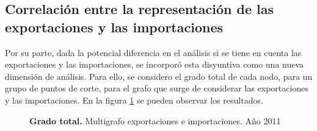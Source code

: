 \documentclass[runningheads,a4paper]{llncs}
\begin{document}
\subsection{Correlación entre la representación de las exportaciones y las importaciones}

Por su parte, dada la potencial diferencia en el análisis si se tiene en cuenta las exportaciones y las importaciones, se incorporó esta disyuntiva como una nueva dimensión de análisis. Para ello, se considero el grado total de cada nodo, para un grupo de puntos de corte, para el grafo que surge de considerar las exportaciones y las importaciones. En la figura \ref{fig:corr} se pueden observar los resultados.


\begin{figure}
\centering
{}
\caption{\textbf{Grado total.} Multigrafo exportaciones e importaciones. Año 2011}
\label{fig:corr}
\end{figure}
\end{document}
